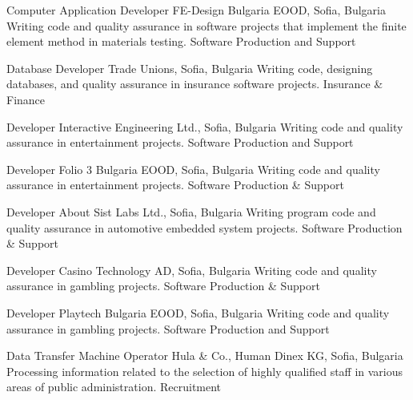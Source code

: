 \documentclass[english,a4paper]{europasscv}
\begin{document}
\begin{europasscv}
   {Computer Application Developer}
  \ecvitem {} {FE-Design Bulgaria EOOD, Sofia, Bulgaria}
  \ecvitem {} {Writing code and quality assurance in software projects that implement the finite element method in materials testing.}
  \ecvitem {} { \quad Software Production and Support}
  
   {Database Developer}
  \ecvitem {} {Trade Unions, Sofia, Bulgaria}
  \ecvitem {} {Writing code, designing databases, and quality assurance in insurance software projects.}
  \ecvitem {} { \quad Insurance \& Finance}
  
   {Developer}
  \ecvitem {} {Interactive Engineering Ltd., Sofia, Bulgaria}
  \ecvitem {} {Writing code and quality assurance in entertainment projects.}
  \ecvitem {} { \quad Software Production and Support}
  
   {Developer}
  \ecvitem {} {Folio 3 Bulgaria EOOD, Sofia, Bulgaria}
  \ecvitem {} {Writing code and quality assurance in entertainment projects.}
  \ecvitem {} { \quad Software Production \& Support}
  
   {Developer}
  \ecvitem {} {About Sist Labs Ltd., Sofia, Bulgaria}
  \ecvitem {} {Writing program code and quality assurance in automotive embedded system projects.}
  \ecvitem {} { \quad Software Production \& Support}
  
   {Developer}
  \ecvitem {} {Casino Technology AD, Sofia, Bulgaria}
  \ecvitem {} {Writing code and quality assurance in gambling projects.}
  \ecvitem {} { \quad Software Production \& Support}

   {Developer}
  \ecvitem {} {Playtech Bulgaria EOOD, Sofia, Bulgaria}
  \ecvitem {} {Writing code and quality assurance in gambling projects.}
  \ecvitem {} { \quad Software Production and Support}
  
   {Data Transfer Machine Operator}
  \ecvitem {} {Hula \& Co., Human Dinex KG, Sofia, Bulgaria}
  \ecvitem {} {Processing information related to the selection of highly qualified staff in various areas of public administration.}
  \ecvitem {} { \quad Recruitment}
  

\end{europasscv}
\end{document}
